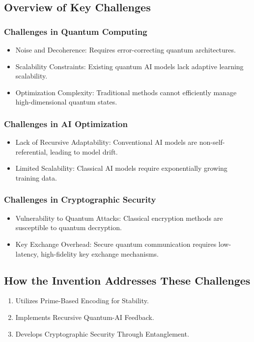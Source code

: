\documentclass{article}
\theoremstyle{plain}
\begin{document}
\subsection{Overview of Key Challenges}
\subsubsection{Challenges in Quantum Computing}
\begin{itemize}
    \item Noise and Decoherence: Requires error-correcting quantum architectures.
    \item Scalability Constraints: Existing quantum AI models lack adaptive learning scalability.
    \item Optimization Complexity: Traditional methods cannot efficiently manage high-dimensional quantum states.
\end{itemize}

\subsubsection{Challenges in AI Optimization}
\begin{itemize}
    \item Lack of Recursive Adaptability: Conventional AI models are non-self-referential, leading to model drift.
    \item Limited Scalability: Classical AI models require exponentially growing training data.
\end{itemize}

\subsubsection{Challenges in Cryptographic Security}
\begin{itemize}
    \item Vulnerability to Quantum Attacks: Classical encryption methods are susceptible to quantum decryption.
    \item Key Exchange Overhead: Secure quantum communication requires low-latency, high-fidelity key exchange mechanisms.
\end{itemize}

\subsection{How the Invention Addresses These Challenges}
\begin{enumerate}
    \item Utilizes Prime-Based Encoding for Stability.
    \item Implements Recursive Quantum-AI Feedback.
    \item Develops Cryptographic Security Through Entanglement.
\end{enumerate}
\end{document}

